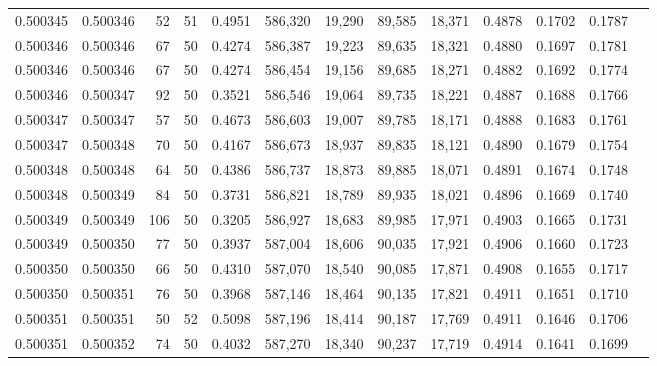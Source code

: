 \begin{tabular}{rrrrrrrrrrrrr}
0.500345 & 0.500346 &    52 &  51 &                                     0.4951 & 586,320 &  19,290 &  89,585 &  18,371 & 0.4878 & 0.1702 & 0.1787 \\
0.500346 & 0.500346 &    67 &  50 &                                     0.4274 & 586,387 &  19,223 &  89,635 &  18,321 & 0.4880 & 0.1697 & 0.1781 \\
0.500346 & 0.500346 &    67 &  50 &                                     0.4274 & 586,454 &  19,156 &  89,685 &  18,271 & 0.4882 & 0.1692 & 0.1774 \\
0.500346 & 0.500347 &    92 &  50 &                                     0.3521 & 586,546 &  19,064 &  89,735 &  18,221 & 0.4887 & 0.1688 & 0.1766 \\
0.500347 & 0.500347 &    57 &  50 &                                     0.4673 & 586,603 &  19,007 &  89,785 &  18,171 & 0.4888 & 0.1683 & 0.1761 \\
0.500347 & 0.500348 &    70 &  50 &                                     0.4167 & 586,673 &  18,937 &  89,835 &  18,121 & 0.4890 & 0.1679 & 0.1754 \\
0.500348 & 0.500348 &    64 &  50 &                                     0.4386 & 586,737 &  18,873 &  89,885 &  18,071 & 0.4891 & 0.1674 & 0.1748 \\
0.500348 & 0.500349 &    84 &  50 &                                     0.3731 & 586,821 &  18,789 &  89,935 &  18,021 & 0.4896 & 0.1669 & 0.1740 \\
0.500349 & 0.500349 &   106 &  50 &                                     0.3205 & 586,927 &  18,683 &  89,985 &  17,971 & 0.4903 & 0.1665 & 0.1731 \\
0.500349 & 0.500350 &    77 &  50 &                                     0.3937 & 587,004 &  18,606 &  90,035 &  17,921 & 0.4906 & 0.1660 & 0.1723 \\
0.500350 & 0.500350 &    66 &  50 &                                     0.4310 & 587,070 &  18,540 &  90,085 &  17,871 & 0.4908 & 0.1655 & 0.1717 \\
0.500350 & 0.500351 &    76 &  50 &                                     0.3968 & 587,146 &  18,464 &  90,135 &  17,821 & 0.4911 & 0.1651 & 0.1710 \\
0.500351 & 0.500351 &    50 &  52 &                                     0.5098 & 587,196 &  18,414 &  90,187 &  17,769 & 0.4911 & 0.1646 & 0.1706 \\
0.500351 & 0.500352 &    74 &  50 &                                     0.4032 & 587,270 &  18,340 &  90,237 &  17,719 & 0.4914 & 0.1641 & 0.1699 \\

\end{tabular}
